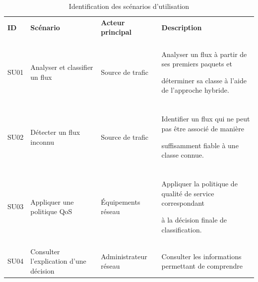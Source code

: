 \begin{table}[H]

\centering

\caption{Identification des scénarios d'utilisation}

\label{tab:scenarios-utilisation}

\small

\begin{tabularx}{\textwidth}{|p{1.4cm}|p{4cm}|p{3.2cm}|Y|}

\hline

\textbf{ID} & \textbf{Scénario} & \textbf{Acteur principal} &

\textbf{Description} \\\\

\hline



SU01 & Analyser et classifier un flux &

Source de trafic &

Analyser un flux à partir de ses premiers paquets et

déterminer sa classe à l'aide de l'approche hybride. \\\\

\hline



SU02 & Détecter un flux inconnu &

Source de trafic &

Identifier un flux qui ne peut pas être associé de manière

suffisamment fiable à une classe connue. \\\\

\hline



SU03 & Appliquer une politique QoS &

Équipements réseau &

Appliquer la politique de qualité de service correspondant

à la décision finale de classification. \\\\

\hline



SU04 & Consulter l'explication d'une décision &

Administrateur réseau &

Consulter les informations permettant de comprendre


\end{tabularx}
\end{table}
